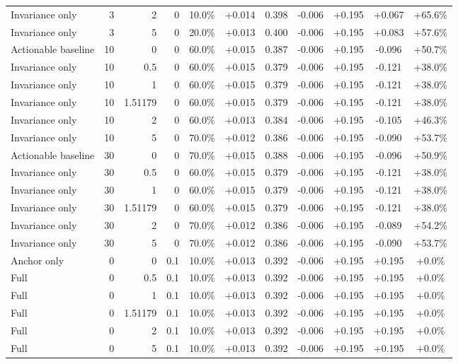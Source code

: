 \begin{table}[htbp]
\begin{tabular}{lrrrccccccc}
Invariance only & 3 & 2 & 0 & 10.0\% & +0.014 & 0.398 & -0.006 & +0.195 & +0.067 & +65.6\% \\
Invariance only & 3 & 5 & 0 & 20.0\% & +0.013 & 0.400 & -0.006 & +0.195 & +0.083 & +57.6\% \\
Actionable baseline & 10 & 0 & 0 & 60.0\% & +0.015 & 0.387 & -0.006 & +0.195 & -0.096 & +50.7\% \\
Invariance only & 10 & 0.5 & 0 & 60.0\% & +0.015 & 0.379 & -0.006 & +0.195 & -0.121 & +38.0\% \\
Invariance only & 10 & 1 & 0 & 60.0\% & +0.015 & 0.379 & -0.006 & +0.195 & -0.121 & +38.0\% \\
Invariance only & 10 & 1.51179 & 0 & 60.0\% & +0.015 & 0.379 & -0.006 & +0.195 & -0.121 & +38.0\% \\
Invariance only & 10 & 2 & 0 & 60.0\% & +0.013 & 0.384 & -0.006 & +0.195 & -0.105 & +46.3\% \\
Invariance only & 10 & 5 & 0 & 70.0\% & +0.012 & 0.386 & -0.006 & +0.195 & -0.090 & +53.7\% \\
Actionable baseline & 30 & 0 & 0 & 70.0\% & +0.015 & 0.388 & -0.006 & +0.195 & -0.096 & +50.9\% \\
Invariance only & 30 & 0.5 & 0 & 60.0\% & +0.015 & 0.379 & -0.006 & +0.195 & -0.121 & +38.0\% \\
Invariance only & 30 & 1 & 0 & 60.0\% & +0.015 & 0.379 & -0.006 & +0.195 & -0.121 & +38.0\% \\
Invariance only & 30 & 1.51179 & 0 & 60.0\% & +0.015 & 0.379 & -0.006 & +0.195 & -0.121 & +38.0\% \\
Invariance only & 30 & 2 & 0 & 70.0\% & +0.012 & 0.386 & -0.006 & +0.195 & -0.089 & +54.2\% \\
Invariance only & 30 & 5 & 0 & 70.0\% & +0.012 & 0.386 & -0.006 & +0.195 & -0.090 & +53.7\% \\
Anchor only & 0 & 0 & 0.1 & 10.0\% & +0.013 & 0.392 & -0.006 & +0.195 & +0.195 & +0.0\% \\
Full & 0 & 0.5 & 0.1 & 10.0\% & +0.013 & 0.392 & -0.006 & +0.195 & +0.195 & +0.0\% \\
Full & 0 & 1 & 0.1 & 10.0\% & +0.013 & 0.392 & -0.006 & +0.195 & +0.195 & +0.0\% \\
Full & 0 & 1.51179 & 0.1 & 10.0\% & +0.013 & 0.392 & -0.006 & +0.195 & +0.195 & +0.0\% \\
Full & 0 & 2 & 0.1 & 10.0\% & +0.013 & 0.392 & -0.006 & +0.195 & +0.195 & +0.0\% \\
Full & 0 & 5 & 0.1 & 10.0\% & +0.013 & 0.392 & -0.006 & +0.195 & +0.195 & +0.0\% \\

\end{tabular}
\end{table}
